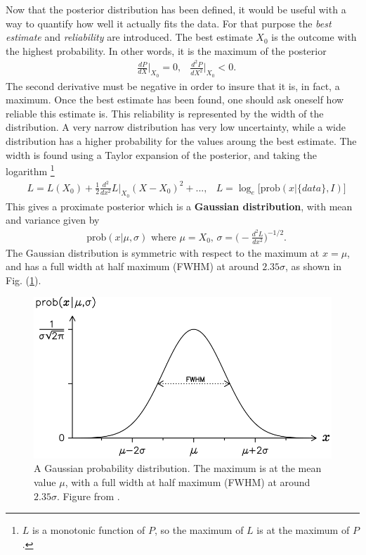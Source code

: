 \documentclass[twoside,english]{uiofysmaster}
\begin{document}
Now that the posterior distribution has been defined, it would be useful with a way to quantify how well it actually fits the data. For that purpose the \textit{best estimate} and \textit{reliability} are introduced. The best estimate $X_0$  is the outcome with the highest probability. In other words, it is the maximum of the posterior
\begin{align}
&\frac{dP}{dX}\Big|_{X_0} = 0, &\frac{d^2P}{dX^2}\Big|_{X_0} < 0.
\end{align}
The second derivative must be negative in order to insure that it is, in fact, a maximum. Once the best estimate has been found, one should ask oneself how reliable this estimate is. This reliability is represented by the width of the distribution. A very narrow distribution has very low uncertainty, while a wide distribution has a higher probability for the values aroung the best estimate. The width is found using a Taylor expansion of the posterior, and taking the logarithm \footnote{$L$ is a monotonic function of $P$, so the maximum of $L$ is at the maximum of $P$.}
\begin{align}
&L = L(X_0) + \frac{1}{2} \frac{d^2}{dx^2} L\Big|_{X_0} (X-X_0)^2 +... ,&L = \log_e \Big[\text{prob}(x | \{data\}, I) \Big]\label{Eq:: gaussian process : Taylor expansion L}
\end{align}
This gives a proximate posterior which is a \textbf{Gaussian distribution}, with mean and variance given by
\begin{align}
&\text{prob}(x| \mu, \sigma) \text{ where } \mu = X_0\text{, } \sigma = \Big( - \frac{d^2L}{dx^2} \Big)^{-1/2}.
\end{align}
The Gaussian distribution is symmetric with respect to the maximum at $x = \mu$, and has a full width at half maximum (FWHM) at around $2.35 \sigma$, as shown in Fig. (\ref{Fig:: gaussian process : Gaussian distribution}).

\begin{figure}
\centering
\includegraphics[scale=0.5]{sivia_gaussian_distribution.png}
\caption{A Gaussian probability distribution. The maximum is at the mean value $\mu$, with a full width at half maximum (FWHM) at around $2.35 \sigma$. Figure from \cite{sivia2006data}.}
\label{Fig:: gaussian process : Gaussian distribution}
\end{figure}
\end{document}

